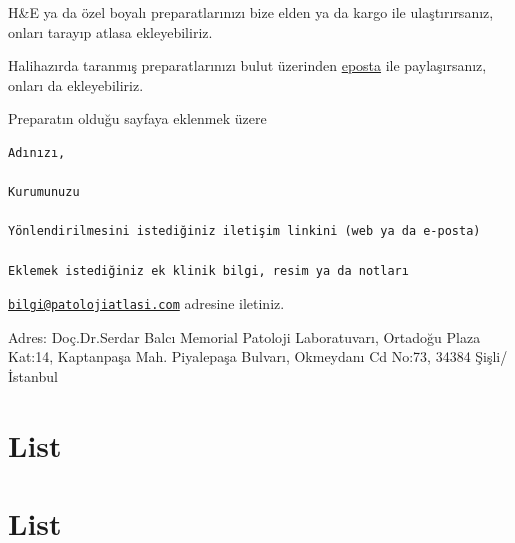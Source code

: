 \documentclass[
  letterpaper,
  DIV=11,
  numbers=noendperiod]{scrreprt}
\begin{document}
H\&E ya da özel boyalı preparatlarınızı bize elden ya da kargo ile
ulaştırırsanız, onları tarayıp atlasa ekleyebiliriz.

Halihazırda taranmış preparatlarınızı bulut üzerinden
\href{mailto:bilgi@patolojiatlasi.com}{eposta} ile paylaşırsanız, onları
da ekleyebiliriz.

Preparatın olduğu sayfaya eklenmek üzere

\begin{verbatim}
Adınızı,

Kurumunuzu

Yönlendirilmesini istediğiniz iletişim linkini (web ya da e-posta)

Eklemek istediğiniz ek klinik bilgi, resim ya da notları
\end{verbatim}

\href{mailto:bilgi@patolojiatlasi.com}{\nolinkurl{bilgi@patolojiatlasi.com}}
adresine iletiniz.

Adres: Doç.Dr.Serdar Balcı Memorial Patoloji Laboratuvarı, Ortadoğu
Plaza Kat:14, Kaptanpaşa Mah. Piyalepaşa Bulvarı, Okmeydanı Cd No:73,
34384 Şişli/İstanbul

\hypertarget{section-4}{%
\chapter{}\label{section-4}}

\hypertarget{list}{%
\chapter{List}\label{list}}

\hypertarget{list-1}{%
\chapter{List}\label{list-1}}
\end{document}
